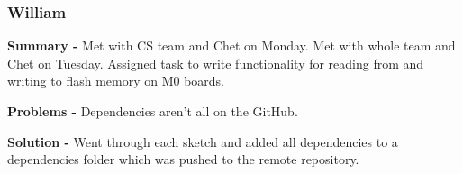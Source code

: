 \documentclass[onecolumn, draftclsnofoot,10pt, compsoc]{IEEEtran}
\begin{document}
\subsubsection*{William}
    \begin{adjustwidth}{2.5em}{0pt}
    \textbf{Summary -} Met with CS team and Chet on Monday. Met with whole team and Chet on Tuesday. Assigned task to write functionality for reading from and writing to flash memory on M0 boards.

    \textbf{Problems -} Dependencies aren't all on the GitHub.
    \end{adjustwidth}
    \begin{adjustwidth}{5em}{0pt}
    \textbf{Solution -} Went through each sketch and added all dependencies to a dependencies folder which was pushed to the remote repository.
    \end{adjustwidth}
\end{document}
